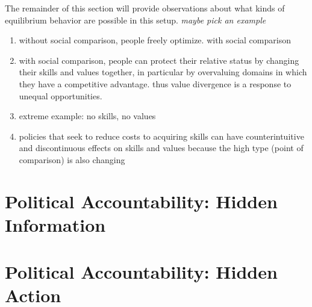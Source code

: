 \documentclass[../../../main.tex]{subfiles}
\begin{document}
The remainder of this section will provide observations about what kinds of equilibrium behavior are possible in this setup. \textit{maybe pick an example}
\begin{enumerate}
    \item without social comparison, people freely optimize. with social comparison
    \item with social comparison, people can protect their relative status by changing their skills and values together, in particular by overvaluing domains in which they have a competitive advantage. thus value divergence is a response to unequal opportunities.
    \item extreme example: no skills, no values
    \item policies that seek to reduce costs to acquiring skills can have counterintuitive and discontinuous effects on skills and values because the high type (point of comparison) is also changing
\end{enumerate}

\section{Political Accountability: Hidden Information}

\nocite{harrington1993economic}
\nocite{caneswrone2001leadership}

\section{Political Accountability: Hidden Action}

\nocite{ferejohn1986incumbent}
\nocite{duggan2000repeated}

\printbibliography[
    heading=subbibintoc,
    title={References}
]
\end{document}
